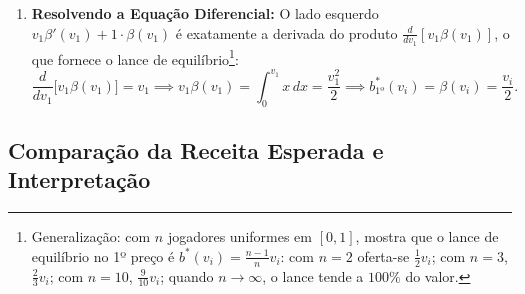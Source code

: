 \begin{enumerate}[label=\arabic*.]
    \item \textbf{Resolvendo a Equação Diferencial:} O lado esquerdo $v_1 \beta'(v_1) + 1 \cdot \beta(v_1)$ é exatamente a derivada do produto $\frac{d}{dv_1}[v_1 \beta(v_1)]$, o que fornece o lance de equilíbrio\footnote{Generalização: com $n$ jogadores uniformes em $[0, 1]$, \cite[p.~17]{vickrey1961} mostra que o lance de equilíbrio no 1º preço é $b^*(v_i) = \frac{n-1}{n}v_i$: com $n=2$ oferta-se $\frac{1}{2}v_i$; com $n=3$, $\frac{2}{3}v_i$; com $n=10$, $\frac{9}{10}v_i$; quando $n \to \infty$, o lance tende a $100\%$ do valor.}:
    \begin{equation}
    \frac{d}{dv_1}\!\big[v_1 \beta(v_1)\big] = v_1 \implies v_1 \beta(v_1) = \int_0^{v_1} x\, dx = \frac{v_1^2}{2} \implies \boxed{b_{\text{1º}}^*(v_i) = \beta(v_i) = \frac{v_i}{2}.}
    \end{equation}
\end{enumerate}

\subsection{Comparação da Receita Esperada e Interpretação}
\label{subsec:interpretacao_modelo}

